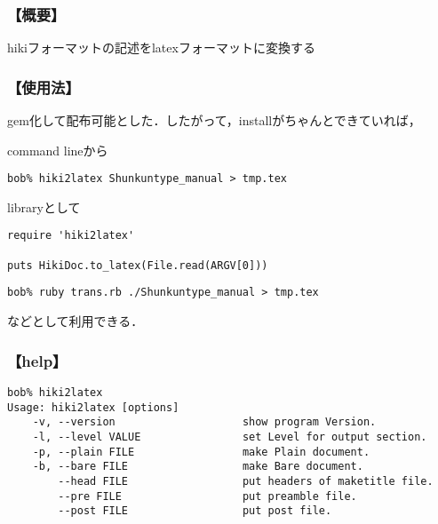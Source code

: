 
\subsubsection{【概要】}
hikiフォーマットの記述をlatexフォーマットに変換する

\subsubsection{【使用法】}
gem化して配布可能とした．したがって，installがちゃんとできていれば，
\begin{description}
\item[command lineから] 

\end{description}\begin{lstlisting}[style=customCsh]
bob% hiki2latex Shunkuntype_manual > tmp.tex
\end{lstlisting}\begin{description}
\item[libraryとして] 

\end{description}\begin{lstlisting}[style=customRuby]
require 'hiki2latex'

puts HikiDoc.to_latex(File.read(ARGV[0]))
\end{lstlisting}\begin{lstlisting}[style=customCsh]
bob% ruby trans.rb ./Shunkuntype_manual > tmp.tex
\end{lstlisting}
などとして利用できる．

\subsubsection{【help】}\begin{lstlisting}[style=customCsh]
bob% hiki2latex
Usage: hiki2latex [options]
    -v, --version                    show program Version.
    -l, --level VALUE                set Level for output section.
    -p, --plain FILE                 make Plain document.
    -b, --bare FILE                  make Bare document.
        --head FILE                  put headers of maketitle file.
        --pre FILE                   put preamble file.
        --post FILE                  put post file.
\end{lstlisting}
